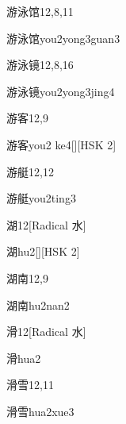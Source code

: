 \begin{entry}{游泳馆}{12,8,11}
  \begin{phonetics}{游泳馆}{you2yong3guan3}
  \end{phonetics}
\end{entry}

\begin{entry}{游泳镜}{12,8,16}
  \begin{phonetics}{游泳镜}{you2yong3jing4}
  \end{phonetics}
\end{entry}

\begin{entry}{游客}{12,9}
  \begin{phonetics}{游客}{you2 ke4}[][HSK 2]
  \end{phonetics}
\end{entry}

\begin{entry}{游艇}{12,12}
  \begin{phonetics}{游艇}{you2ting3}
  \end{phonetics}
\end{entry}

\begin{entry}{湖}{12}[Radical 水]
  \begin{phonetics}{湖}{hu2}[][HSK 2]
  \end{phonetics}
\end{entry}

\begin{entry}{湖南}{12,9}
  \begin{phonetics}{湖南}{hu2nan2}
  \end{phonetics}
\end{entry}

\begin{entry}{滑}{12}[Radical 水]
  \begin{phonetics}{滑}{hua2}
  \end{phonetics}
\end{entry}

\begin{entry}{滑雪}{12,11}
  \begin{phonetics}{滑雪}{hua2xue3}
  \end{phonetics}
\end{entry}

